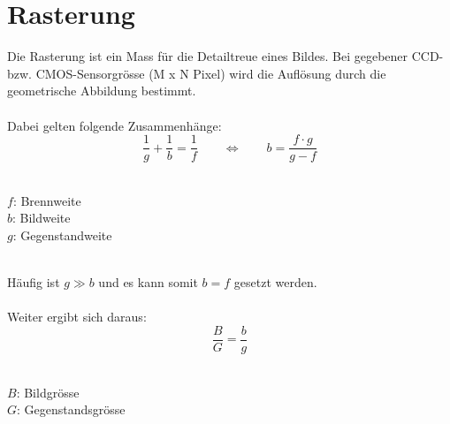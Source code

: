 \section{Rasterung}
Die Rasterung ist ein Mass für die Detailtreue eines Bildes. 
Bei gegebener CCD- bzw. CMOS-Sensorgrösse (M x N Pixel) wird die Auflösung durch die geometrische Abbildung bestimmt.\\
\\
Dabei gelten folgende Zusammenhänge:\\
\[
	\frac{1}{g} + \frac{1}{b} = \frac{1}{f} \qquad \Leftrightarrow \qquad b = \frac{f \cdot g}{g - f}
\]\\
\begin{footnotesize}
	$f$: Brennweite\\
	$b$: Bildweite\\
	$g$: Gegenstandweite\\
\end{footnotesize}
\\
Häufig ist $g \gg b$ und es kann somit $b = f$ gesetzt werden.\\
\\
Weiter ergibt sich daraus:\\
\[
	\frac{B}{G} = \frac{b}{g}
\]\\
\begin{footnotesize}
	$B$: Bildgrösse\\
	$G$: Gegenstandsgrösse\\
\end{footnotesize}


